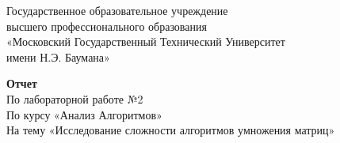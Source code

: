 \begin{titlepage}
	
	\thispagestyle{empty}
	
	\begin{figure}[t]
	\end{figure}
	\begin{center}
	Государственное образовательное учреждение\\
	высшего профессионального образования\\
 	«Московский Государственный Технический Университет\\
 	имени Н.Э. Баумана»
	\end{center}
	
	\vspace{5cm}
	
	\begin{center}
		\textbf {Отчет}\\
		По лабораторной работе №2 \\
		По курсу «Анализ Алгоритмов»\\
		На тему «Исследование сложности алгоритмов умножения матриц»\\
	\end{center}

	\vspace{10cm}
	

\end{titlepage}